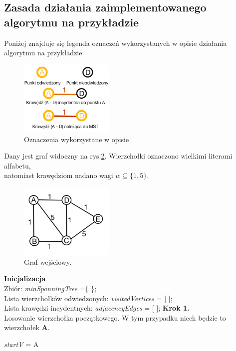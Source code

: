 \newpage
\subsection{Zasada działania zaimplementowanego algorytmu na przykładzie}
Poniżej znajduje się legenda oznaczeń wykorzystanych w opisie działania algorytmu na przykładzie.

\begin{figure}[htb!]
	\centering
	\includegraphics[width=0.4\textwidth]{tex/fig/legenda}
	\caption{Oznaczenia wykorzystane w opisie}
	\label{fig: legenda}
\end{figure}

Dany jest graf widoczny na rys.\ref{fig: g1}.  Wierzchołki oznaczono wielkimi literami alfabetu,\\ natomiast krawędziom nadano wagi $w\subseteq \{1,5\}$.\\

\begin{figure}[htb!]
	\centering
		\includegraphics[width=0.4\textwidth]{tex/fig/graf1}
\caption{Graf wejściowy.}
\label{fig: g1}
\end{figure}

\textbf{Inicjalizacja}\\
Zbiór: \emph{minSpanningTree} =\{ \};\\
Lista wierzchołków odwiedzonych: \emph{visitedVertices} = [ ];\\
Lista krawędzi incydentnych: \emph{adjacencyEdges} = [ ];
\newpage
\textbf{Krok 1.}\\
Losowanie wierzchołka początkowego. W tym przypadku niech będzie to wierzchołek \textbf{A}.
\begin{center}
	\emph{startV} = A
\end{center}

